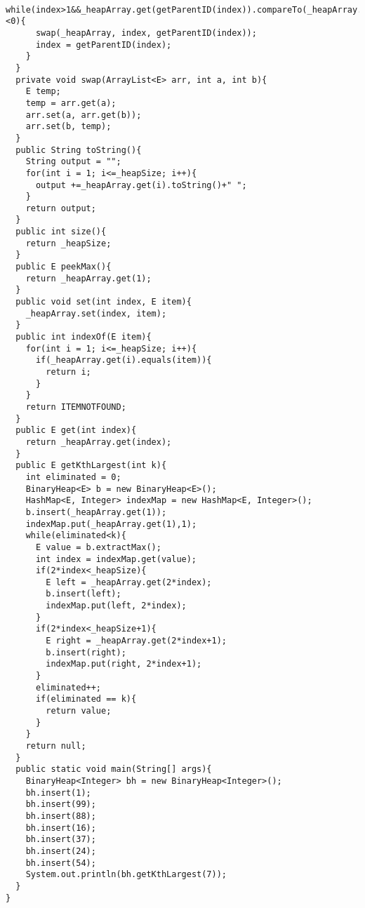 \documentclass[11pt]{article}
\theoremstyle{definition}
\begin{document}
\begin{verbatim}
    while(index>1&&_heapArray.get(getParentID(index)).compareTo(_heapArray.get(index))<0){
      swap(_heapArray, index, getParentID(index));
      index = getParentID(index);
    }
  }
  private void swap(ArrayList<E> arr, int a, int b){
    E temp;
    temp = arr.get(a);
    arr.set(a, arr.get(b));
    arr.set(b, temp);
  }
  public String toString(){
    String output = "";
    for(int i = 1; i<=_heapSize; i++){
      output +=_heapArray.get(i).toString()+" ";
    }
    return output;
  }
  public int size(){
    return _heapSize;
  }
  public E peekMax(){
    return _heapArray.get(1);
  }
  public void set(int index, E item){
    _heapArray.set(index, item);
  }
  public int indexOf(E item){
    for(int i = 1; i<=_heapSize; i++){
      if(_heapArray.get(i).equals(item)){
        return i;
      }
    }
    return ITEMNOTFOUND;
  }
  public E get(int index){
    return _heapArray.get(index);
  }
  public E getKthLargest(int k){
    int eliminated = 0;
    BinaryHeap<E> b = new BinaryHeap<E>();
    HashMap<E, Integer> indexMap = new HashMap<E, Integer>();
    b.insert(_heapArray.get(1));
    indexMap.put(_heapArray.get(1),1);
    while(eliminated<k){
      E value = b.extractMax();
      int index = indexMap.get(value);
      if(2*index<_heapSize){
        E left = _heapArray.get(2*index);
        b.insert(left);
        indexMap.put(left, 2*index);
      }
      if(2*index<_heapSize+1){
        E right = _heapArray.get(2*index+1);
        b.insert(right);
        indexMap.put(right, 2*index+1);
      }
      eliminated++;
      if(eliminated == k){
        return value;
      }
    }
    return null;
  }
  public static void main(String[] args){
    BinaryHeap<Integer> bh = new BinaryHeap<Integer>();
    bh.insert(1);
    bh.insert(99);
    bh.insert(88);
    bh.insert(16);
    bh.insert(37);
    bh.insert(24);
    bh.insert(54);
    System.out.println(bh.getKthLargest(7));
  }
}
\end{verbatim}
\clearpage
\end{document}
